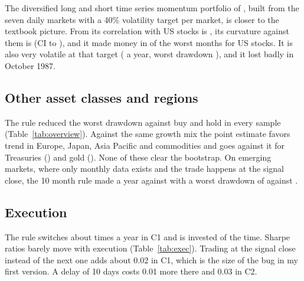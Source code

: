 \documentclass[11pt]{article}
\newcommand{\fit}[1]{\resizebox{\textwidth}{!}{}}
\begin{document}
The diversified long and short time series momentum portfolio of \citet{mop}, built from the seven daily markets with a 40\% volatility target per market, is closer to the textbook picture. From  its correlation with US stocks is , its curvature against them is  (CI  to ), and it made money in  of the  worst months for US stocks. It is also very volatile at that target ( a year, worst drawdown ), and it lost badly in October 1987.

\subsection{Other asset classes and regions}

\begin{table}[H]
\centering\small

\caption{Every sample, 50/200 rule against buy and hold and the same volatility mix.}\label{tab:overview}
\end{table}

The rule reduced the worst drawdown against buy and hold in every sample (Table~\ref{tab:overview}). Against the same growth mix the point estimate favors trend in Europe, Japan, Asia Pacific and commodities and goes against it for Treasuries () and gold (). None of these clear the bootstrap. On emerging markets, where only monthly data exists and the trade happens at the signal close, the 10 month rule made  a year against  with a worst drawdown of  against .

\subsection{Execution}

\begin{table}[H]
\centering\small
\fit{execution.tex}
\caption{Sharpe ratio of the 50/200 rule by delay (days between the signal close and the trade) and cost per unit of turnover.}\label{tab:exec}
\end{table}

The rule switches about  times a year in C1 and is invested  of the time. Sharpe ratios barely move with execution (Table~\ref{tab:exec}). Trading at the signal close instead of the next one adds about 0.02 in C1, which is the size of the bug in my first version. A delay of 10 days costs 0.01 more there and 0.03 in C2.
\end{document}
